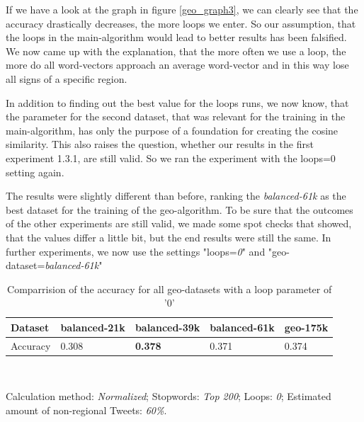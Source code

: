 \documentclass[../Main.tex]{subfiles}
\begin{document}
If we have a look at the graph in figure \ref{geo_graph3}, we can clearly see that the accuracy drastically decreases, the more loops we enter. So our assumption, that the loops in the main-algorithm would lead to better results has been falsified. We now came up with the explanation, that the more often we use a loop, the more do all word-vectors approach an average word-vector and in this way lose all signs of a specific region.

In addition to finding out the best value for the loops runs, we now know, that the parameter for the second dataset, that was relevant for the training in the main-algorithm, has only the purpose of a foundation for creating the cosine similarity. This also raises the question, whether our results in the first experiment 1.3.1, are still valid. So we ran the experiment with the loops=0 setting again.

The results were slightly different than before, ranking the \emph{balanced-61k} as the best dataset for the training of the geo-algorithm. To be sure that the outcomes of the other experiments are still valid, we made some spot checks that showed, that the values differ a little bit, but the end results were still the same. In further experiments, we now use the settings "loops=\emph{0}" and "geo-dataset=\emph{balanced-61k}"
\begin{table}
\begin{center}
    \begin{tabular}{|l|llll|}
    \hline
    Dataset     & balanced-21k & balanced-39k & balanced-61k & geo-175k \\ \hline
    Accuracy    & 0.308      & \textbf{0.378}        &0.371       & 0.374               \\ \hline
    \end{tabular} \\
\end{center}
  Calculation method: \textit{Normalized}; Stopwords: \textit{Top 200}; Loops: \textit{0}; Estimated amount of non-regional Tweets: \textit{60\%}.
  \caption{Comparrision of the accuracy for all geo-datasets with a loop parameter of '0'}
  \label{geo_datasets}
\end{table}
\end{document}
